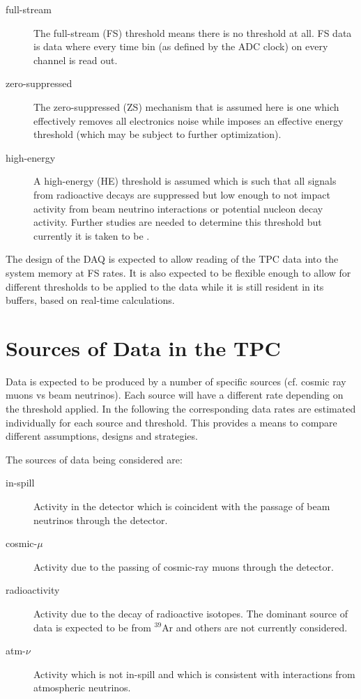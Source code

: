\begin{description}
\item[full-stream] The full-stream (FS) threshold means there is no threshold at all.
FS data is data where every time bin (as defined by the ADC clock) on every channel is read out.
\item[zero-suppressed] The zero-suppressed (ZS) mechanism that is
  assumed here is one which effectively removes all electronics noise
  while imposes an effective \chargezsthreshold energy threshold (which may be subject to further optimization).
\item[high-energy] A high-energy (HE) threshold is assumed which is
  such that all signals from radioactive decays are suppressed but low
  enough to not impact activity from beam neutrino interactions or
  potential nucleon decay activity.
  Further studies are needed to determine this threshold but currently it is taken to be
  \chargehethreshold.
\end{description}

The design of the DAQ is expected to allow reading of the TPC data into the system memory at  FS rates.
It is also expected to be flexible enough to allow for different
thresholds to be applied to the data while it is still resident in its buffers, based on real-time calculations.

\section{Sources of Data in the TPC}

Data is expected to be produced by a number of specific sources (cf. cosmic ray muons vs beam neutrinos).
Each source will have a different rate depending on the threshold applied.
In the following the corresponding data rates are estimated individually for each source and threshold.
This provides a means to compare different assumptions, designs and strategies.

The sources of data being considered are:

\begin{description}
\item[in-spill] Activity in the detector which is coincident with the passage of beam neutrinos through the detector.
\item[cosmic-$\mu$] Activity due to the  passing of cosmic-ray muons through the detector.
\item[radioactivity] Activity due to the decay of radioactive
  isotopes.
  The dominant source of data is expected to be from $^{39}$Ar and
  others are not currently considered.
\item[atm-$\nu$] Activity which is not in-spill and which is
  consistent with interactions from atmospheric neutrinos.
\end{description}

